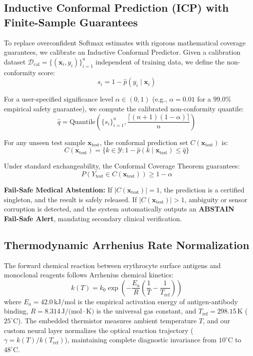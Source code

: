 \documentclass[11pt,a4paper]{article}
\begin{document}
\subsection{Inductive Conformal Prediction (ICP) with Finite-Sample Guarantees}
To replace overconfident Softmax estimates with rigorous mathematical coverage guarantees, we calibrate an Inductive Conformal Predictor. Given a calibration dataset $\mathcal{D}_{\text{cal}} = \{(\mathbf{x}_i, y_i)\}_{i=1}^{n}$ independent of training data, we define the non-conformity score:
\begin{equation}
s_i = 1 - \hat{p}(y_i \mid \mathbf{x}_i)
\end{equation}

For a user-specified significance level $\alpha \in (0, 1)$ (e.g., $\alpha = 0.01$ for a $99.0\%$ empirical safety guarantee), we compute the calibrated non-conformity quantile:
\begin{equation}
\hat{q} = \text{Quantile}\left(\{s_i\}_{i=1}^n, \frac{\lceil (n+1)(1-\alpha) \rceil}{n}\right)
\end{equation}

For any unseen test sample $\mathbf{x}_{\text{test}}$, the conformal prediction set $C(\mathbf{x}_{\text{test}})$ is:
\begin{equation}
C(\mathbf{x}_{\text{test}}) = \{ k \in \mathcal{Y} : 1 - \hat{p}(k \mid \mathbf{x}_{\text{test}}) \le \hat{q} \}
\end{equation}

Under standard exchangeability, the Conformal Coverage Theorem guarantees:
\begin{equation}
P\left(Y_{\text{test}} \in C(\mathbf{x}_{\text{test}})\right) \ge 1 - \alpha
\end{equation}

\textbf{Fail-Safe Medical Abstention:} 
If $|C(\mathbf{x}_{\text{test}})| = 1$, the prediction is a certified singleton, and the result is safely released. If $|C(\mathbf{x}_{\text{test}})| > 1$, ambiguity or sensor corruption is detected, and the system automatically outputs an \textbf{ABSTAIN Fail-Safe Alert}, mandating secondary clinical verification.

\subsection{Thermodynamic Arrhenius Rate Normalization}
The forward chemical reaction between erythrocyte surface antigens and monoclonal reagents follows Arrhenius chemical kinetics:
\begin{equation}
k(T) = k_0 \exp\left(-\frac{E_a}{R}\left(\frac{1}{T} - \frac{1}{T_{\text{ref}}}\right)\right)
\end{equation}
where $E_a = 42.0\,\text{kJ/mol}$ is the empirical activation energy of antigen-antibody binding, $R = 8.314\,\text{J/(mol}\cdot\text{K)}$ is the universal gas constant, and $T_{\text{ref}} = 298.15\,\text{K}$ ($25^\circ\text{C}$). The embedded thermistor measures ambient temperature $T$, and our custom neural layer normalizes the optical reaction trajectory ($\gamma = k(T)/k(T_{\text{ref}})$), maintaining complete diagnostic invariance from $10^\circ\text{C}$ to $48^\circ\text{C}$.
\end{document}
